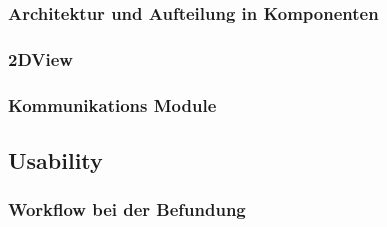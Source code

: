 \subsubsection{Architektur und Aufteilung in Komponenten}
\label{sec:Architektur und Aufteilung in Komponenten}

\subsubsection{2DView}
\label{sec:2DView}


\subsubsection{Kommunikations Module}
\label{sec:Kommunikations Module}

\subsection{Usability}
\label{sec:Usability}

\subsubsection{Workflow bei der Befundung}
\label{sec:Workflow bei der Befundung}

